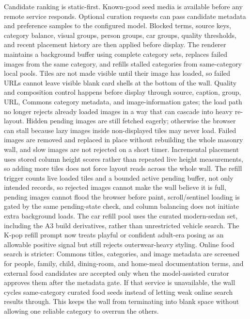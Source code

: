 \documentclass[12pt,letterpaper]{article}
\begin{document}
Candidate ranking is static-first. Known-good seed media is available before any remote service responds. Optional curation requests can pass candidate metadata and preference samples to the configured model. Blocked terms, source keys, category balance, visual groups, person groups, car groups, quality thresholds, and recent placement history are then applied before display. The renderer maintains a background buffer using complete category sets, replaces failed images from the same category, and refills stalled categories from same-category local pools. Tiles are not made visible until their image has loaded, so failed URLs cannot leave visible blank card shells at the bottom of the wall. Quality and composition control happens before display through source, caption, group, URL, Commons category metadata, and image-information gates; the load path no longer rejects already loaded images in a way that can cascade into heavy re-layout. Hidden pending images are still fetched eagerly; otherwise the browser can stall because lazy images inside non-displayed tiles may never load. Failed images are removed and replaced in place without rebuilding the whole masonry wall, and slow images are not rejected on a short timer. Incremental placement uses stored column height scores rather than repeated live height measurements, so adding more tiles does not force layout reads across the whole wall. The refill trigger counts live loaded tiles and a bounded active pending buffer, not only intended records, so rejected images cannot make the wall believe it is full, pending images cannot flood the browser before paint, scroll/sentinel loading is gated by the same pending-state check, and column balancing does not initiate extra background loads. The car refill pool uses the curated modern-sedan set, including the A3 build derivatives, rather than unrestricted vehicle search. The K-pop refill prompt now treats playful or confident adult-era posing as an allowable positive signal but still rejects outerwear-heavy styling. Online food search is stricter: Commons titles, categories, and image metadata are screened for people, family, child, dining-room, and home-meal documentation terms, and external food candidates are accepted only when the model-assisted curator approves them after the metadata gate. If that service is unavailable, the wall cycles same-category curated food seeds instead of letting weak online search results through. This keeps the wall from terminating into blank space without allowing one reliable category to overrun the others.
\end{document}
